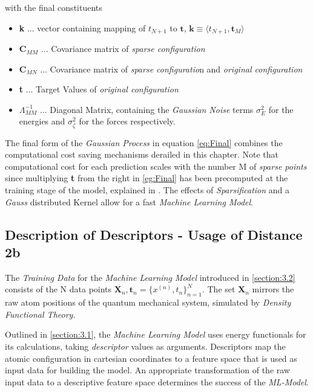 with the final constituents

\begin{itemize}
  \item \textbf{k} ... vector containing mapping of $t_{N+1}$ to $\textbf{t}$, $\textbf{k} \equiv \langle t_{N+1},\textbf{t}_{M} \rangle$
  \item $\textbf{C}_{MM}$ ... Covariance matrix of \textit{sparse configuration}
  \item $\textbf{C}_{MN}$ ... Covariance matrix of \textit{sparse configuratio}n and \textit{original configuration}
    \item \textbf{t} ... Target Values of \textit{original configuration}
  \item $\Lambda_{MM}^{-1}$ ... Diagonal Matrix, containing the \textit{Gaussian Noise} terms $\sigma_{E}^2 $ for the energies and $\sigma_{\zeta}^2 $ for the forces respectively. 
\end{itemize}


The final form of the \textit{Gaussian Process} in equation \ref{eq:Final} combines the computational cost saving mechanisms derailed in this chapter.  Note that computational cost  for each prediction scales with the number M of \textit{sparse points} since multiplying \textbf{t} from the right in \ref{eg:Final} has been precomputed at the training stage of the model, explained in \cite[1054]{GAP-Intro}.
The effects of \textit{Sparsification} and a \textit{Gauss} distributed Kernel allow for a fast \textit{Machine Learning Model}. 



\subsection{Description of Descriptors - Usage of Distance 2b}
\label{subsection:3.3.4}
The \textit{Training Data} for the \textit{Machine Learning Model} introduced in \ref{section:3.2} consists of the N data points  $\textbf{X}_n,\textbf{t}_n  = \{x^{(n)},t_n\}_{n=1}^N$. The set $\textbf{X}_n$ mirrors the raw atom positions of the quantum mechanical system, simulated by \textit{Density Functional Theory}.  

Outlined in \ref{section:3.1}, the \textit{Machine Learning Model} uses energy functionals for its calculations, taking \textit{descriptor} values as arguments. Descriptors map the atomic configuration in cartesian coordinates to a feature space that is used as input data for building the model. An appropriate transformation of the raw input data to a descriptive feature space determines the success of the \textit{ML-Model}. \cite[1055]{GAP-Intro} 

